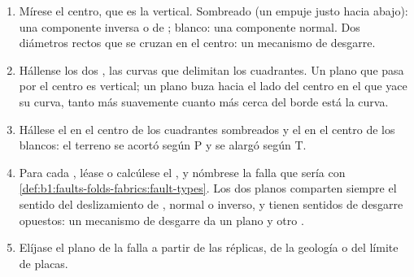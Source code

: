 \begin{method}\label{met:b1:earthquake-source:beachball}
\begin{enumerate}
  \item Mírese el centro, que es la vertical. Sombreado (un empuje justo hacia abajo): una componente inversa o de ; blanco:
        una componente normal. Dos diámetros rectos que se cruzan en el centro: un mecanismo de desgarre.
  \item Hállense los dos , las curvas que delimitan los cuadrantes. Un plano que pasa por el centro es vertical; un plano
        buza hacia el lado del centro en el que yace su curva, tanto más suavemente cuanto más cerca del borde está la curva.
  \item Hállese el  en el centro de los cuadrantes sombreados y el  en el centro de los blancos: el terreno se acortó según P y se
        alargó según T.
  \item Para cada , léase o calcúlese el , y nómbrese la falla que sería con
        \cref{def:b1:faults-folds-fabrics:fault-types}. Los dos planos comparten siempre el sentido del deslizamiento de , normal o
        inverso, y tienen sentidos de desgarre opuestos: un mecanismo de desgarre da un plano  y otro .
  \item Elíjase el plano de la falla a partir de las réplicas, de la geología o del límite de placas.
\end{enumerate}
\end{method}

